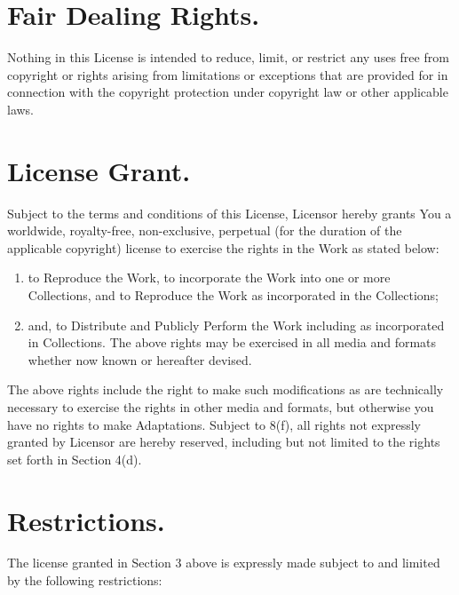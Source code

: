 \section{Fair Dealing Rights.}
Nothing in this License is intended to reduce, limit, or restrict any
uses free from copyright or rights arising from limitations or
exceptions that are provided for in connection with the copyright
protection under copyright law or other applicable laws.


\section{License Grant.}
Subject to the terms and conditions of this License, Licensor hereby
grants You a worldwide, royalty-free, non-exclusive, perpetual (for the
duration of the applicable copyright) license to exercise the rights in
the Work as stated below:
\begin{enumerate}
 \item to Reproduce the Work, to incorporate the
       Work into one or more Collections, and to Reproduce the Work as
       incorporated in the Collections;
 \item and, to Distribute and Publicly
       Perform the Work including as incorporated in Collections. The
       above rights may be exercised in all media and formats whether
       now known or hereafter devised.
\end{enumerate}
The above rights include the right to make such modifications as are
technically necessary to exercise the rights in other media and formats,
but otherwise you have no rights to make Adaptations. Subject to 8(f),
all rights not expressly granted by Licensor are hereby reserved,
including but not limited to the rights set forth in Section 4(d).


\section{Restrictions.}
The license granted in Section 3 above is expressly made subject to and
limited by the following restrictions:

